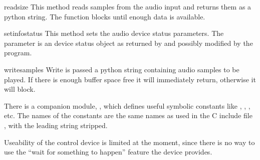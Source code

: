 \begin{funcdesc}{read}{size}
This method reads  samples from the audio input and returns
them as a python string. The function blocks until enough data is available.
\end{funcdesc}

\begin{funcdesc}{setinfo}{status}
This method sets the audio device status parameters. The 
parameter is an device status object as returned by  and
possibly modified by the program.
\end{funcdesc}

\begin{funcdesc}{write}{samples}
Write is passed a python string containing audio samples to be played.
If there is enough buffer space free it will immediately return,
otherwise it will block.
\end{funcdesc}

There is a companion module, , which defines useful
symbolic constants like , ,
, etc. The names of
the constants are the same names as used in the C include file
, with the leading string 
stripped.

Useability of the control device is limited at the moment, since there
is no way to use the ``wait for something to happen'' feature the
device provides.
